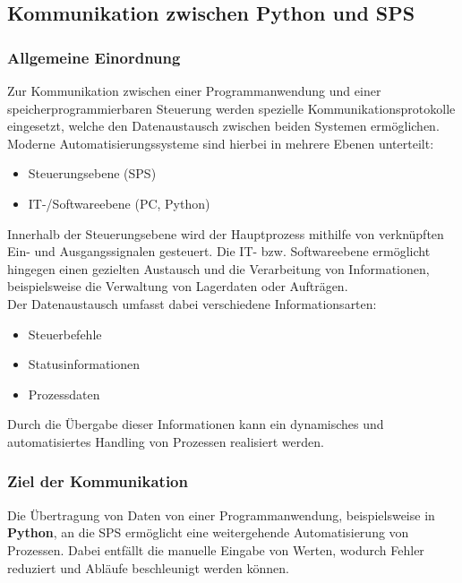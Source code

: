 \subsection{Kommunikation zwischen Python und SPS}

\subsubsection{Allgemeine Einordnung}

Zur Kommunikation zwischen einer Programmanwendung und einer speicherprogrammierbaren Steuerung werden spezielle Kommunikationsprotokolle eingesetzt, welche den Datenaustausch zwischen beiden Systemen ermöglichen.\\

Moderne Automatisierungssysteme sind hierbei in mehrere Ebenen unterteilt:
\begin{itemize}
	\item Steuerungsebene (SPS)
	\item IT-/Softwareebene (PC, Python)
\end{itemize}

Innerhalb der Steuerungsebene wird der Hauptprozess mithilfe von verknüpften Ein- und Ausgangssignalen gesteuert. Die IT- bzw. Softwareebene ermöglicht hingegen einen gezielten Austausch und die Verarbeitung von Informationen, beispielsweise die Verwaltung von Lagerdaten oder Aufträgen\cite{TCP}.\\

Der Datenaustausch umfasst dabei verschiedene Informationsarten:
\begin{itemize}
	\item Steuerbefehle 
	\item Statusinformationen
	\item Prozessdaten
\end{itemize}

Durch die Übergabe dieser Informationen kann ein dynamisches und automatisiertes Handling von Prozessen realisiert werden\cite{TCP}.

\subsubsection{Ziel der Kommunikation}

Die Übertragung von Daten von einer Programmanwendung, beispielsweise in \textbf{Python}, an die SPS ermöglicht eine weitergehende Automatisierung von Prozessen. Dabei entfällt die manuelle Eingabe von Werten, wodurch Fehler reduziert und Abläufe beschleunigt werden können.\\

